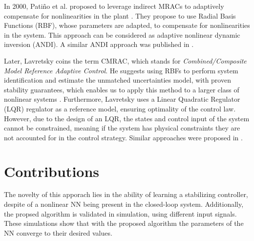 In 2000, Patiño et al. proposed to leverage indirect MRACs to adaptively compensate for nonlinearities in the plant \cite{patinoNeuralNetworkbasedModel2000}. They propose to use Radial Basis Functions (RBF), whose parameters are adapted, to compensate for nonlinearities in the system. This approach can be considered as adaptive nonlinear dynamic inversion (ANDI). A similar ANDI approach was published in \cite{karnalasadanNeuralNetworkBased2004}.

Later, Lavretsky coins the term CMRAC, which stands for \textit{Combined/Composite Model Reference Adaptive Control}. He suggests using RBFs to perform system identification and estimate the unmatched uncertainties model, with proven stability guarantees, which enables us to apply this method to a larger class of nonlinear systems \cite{lavretskyCombinedCompositeModel2009}. Furthermore, Lavretsky uses a Linear Quadratic Regulator (LQR) regulator as a reference model, ensuring optimality of the control law. However, due to the design of an LQR, the states and control input of the system cannot be constrained, meaning if the system has physical constraints they are not accounted for in the control strategy. Similar approaches were proposed in \cite{joshiDeepModelReference2019, trisantoApplicationNeuralNetworks2006, slamaModelReferenceAdaptive2018}.


\section{Contributions}
The novelty of this apporach lies in the ability of learning a stabilizing controller, despite of a nonlinear NN being present in the closed-loop system. 
Additionally, the propsed algorithm is validated in simulation, using different input signals. These simulations show that with the proposed algorithm the parameters of the NN converge to their desired values.